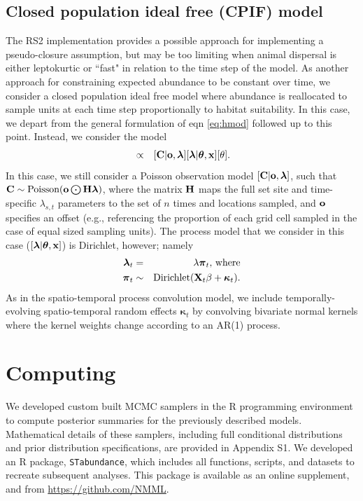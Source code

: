 \documentclass[times,mee,doublespace,]{besauth2}
\begin{document}
\subsection{Closed population ideal free (CPIF) model}

The RS2 implementation provides a possible approach for implementing a pseudo-closure assumption, but may be too limiting when animal dispersal is either leptokurtic or ``fast" in relation to the time step of the model.  As another approach for constraining expected abundance to be constant over time, we consider a closed population
ideal free model where abundance is reallocated to sample units at each time step proportionally to habitat suitability.  In this case, we depart from the general formulation of eqn \ref{eq:hmod} followed up to this point.  Instead, we consider the model
\begin{eqnarray}
  [\boldsymbol{\pi},\boldsymbol{\theta} | {\bf x},{\bf C},{\bf o}] & \propto & [{\bf C} | {\bf o}, \boldsymbol{\lambda}] [\boldsymbol{\lambda} | \boldsymbol{\theta},{\bf x}] [\theta].
  \label{eq:cpif-post}
\end{eqnarray}
In this case, we still consider a Poisson observation model $[{\bf C} | {\bf o}, \boldsymbol{\lambda}]$, such that
${\bf C} \sim \text{Poisson}({\bf o} \bigodot {\bf H}\boldsymbol{\lambda})$, where the matrix ${\bf H}$ maps the full set site and time-specific $\lambda_{s,t}$ parameters to the set of $n$ times and locations sampled, and ${\bf o}$ specifies an offset (e.g., referencing the proportion of each grid cell sampled in the case of equal sized sampling units).  The process model that we consider in this case ($[\boldsymbol{\lambda} | \boldsymbol{\theta},{\bf x}]$) is Dirichlet, however; namely
\begin{eqnarray}
   \boldsymbol{\lambda}_t & = & \lambda \boldsymbol{\pi}_t \text{, where} \\
   \boldsymbol{\pi}_t & \sim & \text{Dirichlet}({\bf X}_t \beta + \boldsymbol{\kappa}_t).
\end{eqnarray}
As in the spatio-temporal process convolution model, we include temporally-evolving spatio-temporal random effects $\boldsymbol{\kappa}_t$ by convolving bivariate normal kernels where the kernel weights change according to an AR(1) process.

\section{Computing}

We developed custom built MCMC samplers in the R programming environment \citep{RTeam2012} to compute posterior summaries for the previously described models.  Mathematical details of these samplers, including full conditional distributions and prior distribution specifications, are provided in Appendix S1.  We developed an R package, \texttt{STabundance}, which includes all functions, scripts, and datasets to recreate subsequent analyses.  This package is available as an online supplement, and from \url{https://github.com/NMML}.
\end{document}
